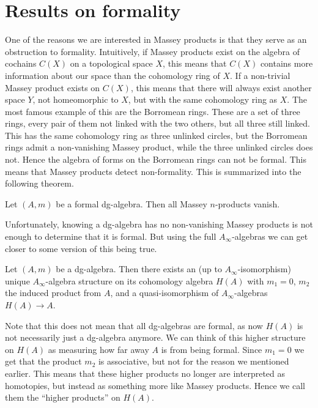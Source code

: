 

\section{Results on formality}

One of the reasons we are interested in Massey products is that they serve as an 
obstruction to formality. Intuitively, if Massey products exist on the algebra of 
cochains $C(X)$ on a topological space $X$, this means that $C(X)$ contains more 
information about our space than the cohomology ring of $X$. If a non-trivial Massey 
product exists on $C(X)$, this means that there will always exist another space $Y$, 
not homeomorphic to $X$, but with the same cohomology ring as $X$. The most famous 
example of this are the Borromean rings. These are a set of three rings, every pair of 
them not linked with the two others, but all three still linked. This has the same 
cohomology ring as three unlinked circles, but the Borromean rings admit a non-vanishing 
Massey product, while the three unlinked circles does not. Hence the algebra of forms 
on the Borromean rings can not be formal. This means that Massey products detect 
non-formality. This is summarized into the following theorem.

\begin{theorem}
    Let $(A, m)$ be a formal dg-algebra. Then all Massey $n$-products vanish.         
\end{theorem}

Unfortunately, knowing a dg-algebra has no non-vanishing Massey products is not enough 
to determine that it is formal. But using the full $A_\infty$-algebras we can get closer 
to some version of this being true.

\begin{theorem}
    \label{thm:Kadeishvili}
    Let $(A,m)$ be a dg-algebra. Then there exists an (up to $A_\infty$-isomorphism) 
    unique $A_\infty$-algebra structure on its cohomology algebra $H(A)$ with $m_1=0$, 
    $m_2$ the induced product from $A$, and a quasi-isomorphism of $A_\infty$-algebras 
    $H(A)\longrightarrow A$.
\end{theorem}

Note that this does not mean that all dg-algebras are formal, as now $H(A)$ is not 
necessarily just a dg-algebra anymore. We can think of this higher structure on $H(A)$ 
as measuring how far away $A$ is from being formal. Since $m_1=0$ we get that the 
product $m_2$ is associative, but not for the reason we mentioned earlier. This means 
that these higher products no longer are interpreted as homotopies, but instead as 
something more like Massey products. Hence we call them the ``higher products'' on $H(A)$.

